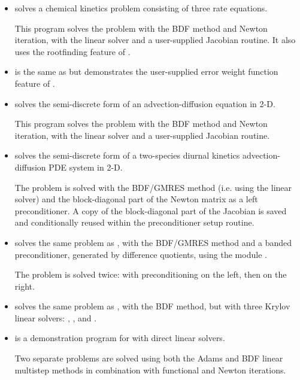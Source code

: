 \begin{itemize}

\item {}
  solves a chemical kinetics problem consisting of three rate equations.

  This program solves the problem with the BDF method and Newton          
  iteration, with the {\cvdense} linear solver and a user-supplied    
  Jacobian routine.  It also uses the rootfinding feature of {\cvodes}.

\item {} 
  is the same as  but demonstrates the user-supplied error
  weight function feature of {\cvodes}.

\item {}
  solves the semi-discrete form of an advection-diffusion equation in 2-D. 

  This program solves the problem with the BDF method and Newton          
  iteration, with the {\cvband} linear solver and a user-supplied     
  Jacobian routine.

\item {}
  solves the semi-discrete form of a two-species diurnal kinetics
  advection-diffusion PDE system in 2-D.

  The problem is solved with the BDF/GMRES method (i.e.    
  using the {\cvspgmr} linear solver) and the block-diagonal part of the  
  Newton matrix as a left preconditioner. A copy of the block-diagonal 
  part of the Jacobian is saved and conditionally reused within the    
  preconditioner setup routine.

\item {}
  solves the same problem as , with the BDF/GMRES method 
  and a banded preconditioner, generated by difference quotients, 
  using the module {\cvbandpre}.

  The problem is solved twice: with preconditioning on the left,
  then on the right.

\item {}
  solves the same problem as , with the BDF method, but with
  three Krylov linear solvers: {\cvspgmr}, {\cvspbcg}, and {\cvsptfqmr}.

\item {}
  is a demonstration program for {\cvodes} with direct linear solvers.

  Two separate problems are solved using both the Adams and BDF linear
  multistep methods in combination with functional and Newton
  iterations. 


\end{itemize}
